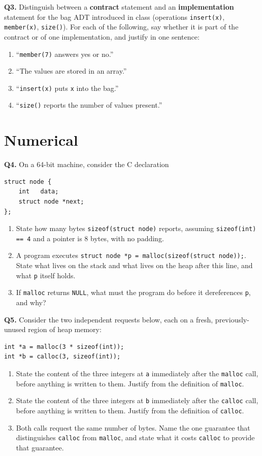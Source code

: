 \documentclass[11pt]{article}
\begin{document}
\textbf{Q3.} Distinguish between a \textbf{contract} statement and an \textbf{implementation} statement for the bag ADT introduced in class (operations \texttt{insert(x)}, \texttt{member(x)}, \texttt{size()}). For each of the following, say whether it is part of the contract or of one implementation, and justify in one sentence:
\begin{enumerate}
  \item[(a)] ``\texttt{member(7)} answers yes or no.''
  \item[(b)] ``The values are stored in an array.''
  \item[(c)] ``\texttt{insert(x)} puts \texttt{x} into the bag.''
  \item[(d)] ``\texttt{size()} reports the number of values present.''
\end{enumerate}

\section{Numerical}

\textbf{Q4.} On a 64-bit machine, consider the C declaration
\begin{verbatim}
struct node {
    int   data;
    struct node *next;
};
\end{verbatim}
\begin{enumerate}
  \item[(a)] State how many bytes \texttt{sizeof(struct node)} reports, assuming \texttt{sizeof(int) == 4} and a pointer is 8 bytes, with no padding.
  \item[(b)] A program executes \texttt{struct node *p = malloc(sizeof(struct node));}. State what lives on the stack and what lives on the heap after this line, and what \texttt{p} itself holds.
  \item[(c)] If \texttt{malloc} returns \texttt{NULL}, what must the program do before it dereferences \texttt{p}, and why?
\end{enumerate}

\textbf{Q5.} Consider the two independent requests below, each on a fresh, previously-unused region of heap memory:
\begin{verbatim}
int *a = malloc(3 * sizeof(int));
int *b = calloc(3, sizeof(int));
\end{verbatim}
\begin{enumerate}
  \item[(a)] State the content of the three integers at \texttt{a} immediately after the \texttt{malloc} call, before anything is written to them. Justify from the definition of \texttt{malloc}.
  \item[(b)] State the content of the three integers at \texttt{b} immediately after the \texttt{calloc} call, before anything is written to them. Justify from the definition of \texttt{calloc}.
  \item[(c)] Both calls request the same number of bytes. Name the one guarantee that distinguishes \texttt{calloc} from \texttt{malloc}, and state what it costs \texttt{calloc} to provide that guarantee.
\end{enumerate}
\end{document}
